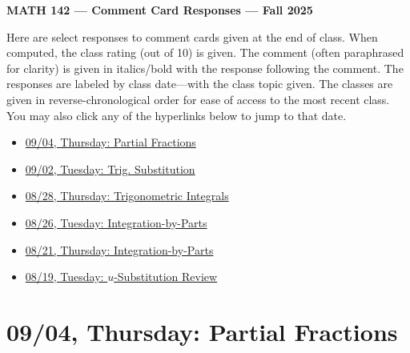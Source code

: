 \documentclass[11pt,letterpaper]{article}
\begin{document}
\begin{center} {\bfseries \LARGE MATH 142 --- Comment Card Responses --- Fall 2025} \end{center}

Here are select responses to comment cards given at the end of class. When computed, the class rating (out of 10) is given. The comment (often paraphrased for clarity) is given in italics/bold with the response following the comment. The responses are labeled by class date---with the class topic given. The classes are given in reverse-chronological order for ease of access to the most recent class. You may also click any of the hyperlinks below to jump to that date.

\begin{itemize}
\item \hyperref[09-04]{09/04, Thursday: Partial Fractions}
\item \hyperref[09-02]{09/02, Tuesday: Trig. Substitution}
\item \hyperref[08-28]{08/28, Thursday: Trigonometric Integrals}
\item \hyperref[08-26]{08/26, Tuesday: Integration-by-Parts}
\item \hyperref[08-21]{08/21, Thursday: Integration-by-Parts}
\item \hyperref[08-19]{08/19, Tuesday: $u$-Substitution Review}
\end{itemize}

\newpage
\section*{09/04, Thursday: Partial Fractions\label{09-04}}
\end{document}
